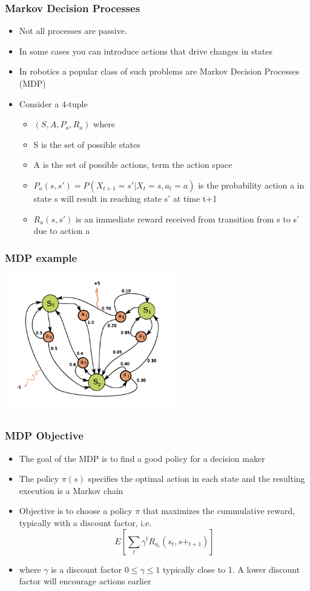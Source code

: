 \documentclass[10pt]{beamer}
\begin{document}
\begin{frame}
  \frametitle{Markov Decision Processes}
  \begin{itemize}
  \item Not all processes are passive.
  \item In some cases you can introduce actions that drive changes in states
  \item In robotics a popular class of such problems are Markov Decision Processes (MDP)
  \item Consider a 4-tuple
    \begin{itemize}
    \item $(S, A, P_a, R_a)$ where
    \item S is the set of possible states
    \item A is the set of possible actions, term the action space
    \item $P_a(s,s') = P(X_{t+1}= s' | X_t = s, a_t = a)$ is the probability action a in state s will result in reaching state s' at time t+1
    \item $R_a(s,s')$ is an immediate reward received from transition from s to s' due to action a
    \end{itemize}
  \end{itemize}
\end{frame}

\begin{frame}
  \frametitle{MDP example}
  \vfill
  \centerline{\includegraphics[height=6cm]{Markov_Decision_Process.svg.png}}
\end{frame}

\begin{frame}
  \frametitle{MDP Objective}
  \begin{itemize}
  \item The goal of the MDP is to find a good policy for a decision maker
  \item The policy $\pi(s)$ specifies the optimal action in each state
    and the resulting execution is a Markov chain
  \item Objective is to choose a policy $\pi$ that maximizes the cummulative reward, typically with a discount factor, i.e.
    \[ E\left[  \sum_t \gamma^t R_{a_t}(s_t, s+_{t+1}) \right] \]
  \item where $\gamma$ is a discount factor $0 \leq \gamma \leq 1$
    typically close to 1. A lower discount factor will encourage
    actions earlier
  \end{itemize}
\end{frame}
\end{document}

